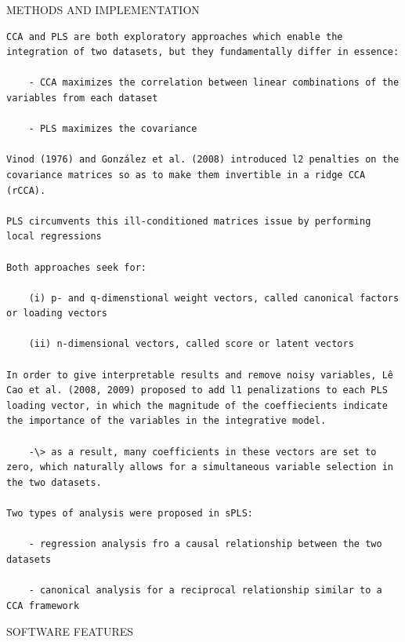 \documentclass[
]{book}
\begin{document}
METHODS AND IMPLEMENTATION

\begin{verbatim}
CCA and PLS are both exploratory approaches which enable the integration of two datasets, but they fundamentally differ in essence:

    - CCA maximizes the correlation between linear combinations of the variables from each dataset

    - PLS maximizes the covariance

Vinod (1976) and González et al. (2008) introduced l2 penalties on the covariance matrices so as to make them invertible in a ridge CCA (rCCA).

PLS circumvents this ill-conditioned matrices issue by performing local regressions

Both approaches seek for:

    (i) p- and q-dimenstional weight vectors, called canonical factors or loading vectors

    (ii) n-dimensional vectors, called score or latent vectors

In order to give interpretable results and remove noisy variables, Lê Cao et al. (2008, 2009) proposed to add l1 penalizations to each PLS loading vector, in which the magnitude of the coeffiecients indicate the importance of the variables in the integrative model.

    -\> as a result, many coefficients in these vectors are set to zero, which naturally allows for a simultaneous variable selection in the two datasets.

Two types of analysis were proposed in sPLS:

    - regression analysis fro a causal relationship between the two datasets

    - canonical analysis for a reciprocal relationship similar to a CCA framework
\end{verbatim}

SOFTWARE FEATURES
\end{document}
